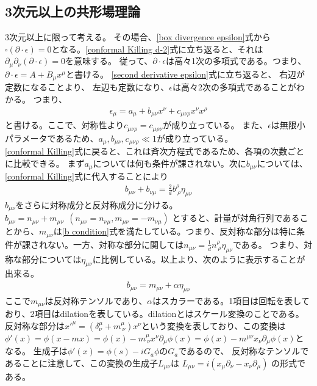\documentclass[11pt, dvipdfmx]{article}
\numberwithin{equation}{section}
\begin{document}
\subsection{3次元以上の共形場理論}
3次元以上に限って考える。
その場合、\eqref{box divergence epsilon}式から$\square(\partial \cdot \epsilon)=0$となる。\eqref{conformal Killing d-2}式に立ち返ると、それは$\partial_\mu\partial_\nu (\partial\cdot\epsilon)=0$を意味する。
従って、$\partial\cdot\epsilon$は高々1次の多項式である。つまり、$\partial\cdot\epsilon = A + B_\mu x^\mu$と書ける。
\eqref{second derivative epsilon}式に立ち返ると、
右辺が定数になることより、
左辺も定数になり、$\epsilon$は高々2次の多項式であることがわかる。
つまり、
\begin{align}
    \epsilon_\mu = a_\mu + b_{\mu\nu}x^\nu + c_{\mu\nu\rho}x^\nu x^\rho
\end{align}
と書ける。ここで、対称性より$c_{\mu\nu\rho}=c_{\mu\rho\nu}$が成り立っている。
また、$\epsilon$は無限小パラメータであるため、$a_\mu,b_{\mu\nu},c_{\mu\nu\rho}\ll1$が成り立っている。
\\\eqref{conformal Killing}式に戻ると、これは斉次方程式であるため、各項の次数ごとに比較できる。
まず$a_\mu$については何も条件が課されない。次に$b_{\mu\nu}$については、\eqref{conformal Killing}式に代入することにより
\begin{align}
    b_{\mu\nu} + b_{\nu\mu} = \frac{2}{d}b^\rho_{\ \rho} \eta_{\mu\nu}\label{b condition}
\end{align}
$b_{\mu\nu}$をさらに対称成分と反対称成分に分ける。$b_{\mu\nu}=n_{\mu\nu}+m_{\mu\nu}\ \ (n_{\mu\nu}=n_{\nu\mu}, m_{\mu\nu}=-m_{\nu\mu})$
とすると、計量が対角行列であることから、$m_{\mu\nu}$は\eqref{b condition}式を満たしている。つまり、反対称な部分は特に条件が課されない。一方、対称な部分に関しては$n_{\mu\nu}=\frac{1}{d}n^\rho_{\ \rho}\eta_{\mu\nu}$である。
つまり、対称な部分については$\eta_{\mu\nu}$に比例している。以上より、次のように表示することが出来る。
\begin{align}
    b_{\mu\nu} = m_{\mu\nu} + \alpha \eta_{\mu\nu}
\end{align}
ここで$m_{\mu\nu}$は反対称テンソルであり、$\alpha$はスカラーである。1項目は回転を表しており、2項目はdilationを表している。dilationとはスケール変換のことである。
    反対称な部分は$x'^{\mu}=(\delta^\mu_\nu+m^\mu_{\ \nu})x^\nu$という変換を表しており、この変換は$\phi'(x)=\phi(x-mx )=\phi(x)-m^{\mu}_{\ \nu}x^\nu\partial_\mu \phi(x)=\phi(x)-m^{\mu\nu}x_{\nu}\partial_\mu\phi(x)$となる。 生成子は$\phi'(x)=\phi(s)-iG_a\phi$の$G_a$であるので、
    反対称なテンソルであることに注意して、この変換の生成子$L_{\mu\nu}$は $L_{\mu\nu} =i (x_\mu \partial_\nu - x_\nu \partial_\mu)$ の形式である。
\end{document}
